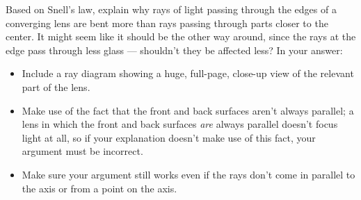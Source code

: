 Based on Snell's law, explain why rays of light passing
through the edges of a converging lens are bent more than
rays passing through parts closer to the center. It might
seem like it should be the other way around, since the rays
at the edge pass through less glass --- shouldn't
they be affected less? In your answer:
\begin{itemize}
\item Include a ray diagram showing a huge, full-page, close-up view of the relevant part of the
lens.
\item Make use of the fact that the front and back surfaces aren't always parallel; a lens in
which the front and back surfaces \emph{are} always parallel doesn't focus light at all, so
if your explanation doesn't make use of this fact, your argument must be incorrect.
\item Make sure your argument still works even if the rays don't come in parallel to
the axis or from a point on the axis.
\end{itemize}
